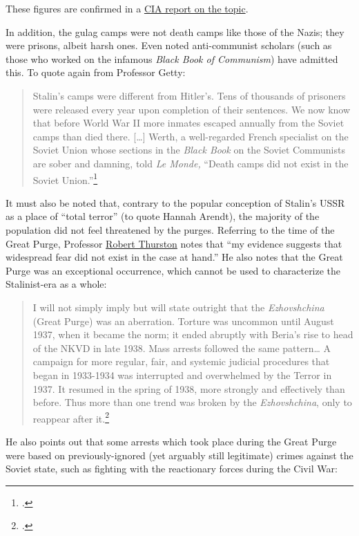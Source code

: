 These figures are confirmed in a
\href{https://www.cia.gov/library/readingroom/docs/CIA-RDP80T00246A032000400001-1.pdf}{CIA
report on the topic}.

In addition, the gulag camps were not death camps like those of the
Nazis; they were prisons, albeit harsh ones. Even noted anti-communist
scholars (such as those who worked on the infamous \emph{Black Book of
Communism}) have admitted this. To quote again from Professor Getty:

\begin{quote}
Stalin's camps were different from Hitler's. Tens of thousands of
prisoners were released every year upon completion of their sentences.
We now know that before World War II more inmates escaped annually from
the Soviet camps than died there. {[}\ldots{]} Werth, a well-regarded
French specialist on the Soviet Union whose sections in the \emph{Black
Book} on the Soviet Communists are sober and damning, told \emph{Le
  Monde,} ``Death camps did not exist in the Soviet Union.''\footcite{getty1993victims}
\end{quote}

It must also be noted that, contrary to the popular conception of
Stalin's USSR as a place of ``total terror'' (to quote Hannah Arendt),
the majority of the population did not feel threatened by the purges.
Referring to the time of the Great Purge, Professor
\href{http://miamioh.edu/cas/academics/departments/history/about/faculty/emeriti-faculty/thurston/index.html}{Robert
Thurston} notes that ``my evidence suggests that widespread fear did not
exist in the case at hand.'' He also notes that the Great Purge was an
exceptional occurrence, which cannot be used to characterize the
Stalinist-era as a whole:

\begin{quote}
I will not simply imply but will state outright that the
\emph{Ezhovshchina} (Great Purge) was an aberration. Torture was
uncommon until August 1937, when it became the norm; it ended abruptly
with Beria's rise to head of the NKVD in late 1938. Mass arrests
followed the same pattern\ldots{} A campaign for more regular, fair, and
systemic judicial procedures that began in 1933-1934 was interrupted and
overwhelmed by the Terror in 1937. It resumed in the spring of 1938,
more strongly and effectively than before. Thus more than one trend was
  broken by the \emph{Ezhovshchina}, only to reappear after it.\footcite{thurston1986desk}
\end{quote}

He also points out that some arrests which took place during the Great
Purge were based on previously-ignored (yet arguably still legitimate)
crimes against the Soviet state, such as fighting with the reactionary
forces during the Civil War:

